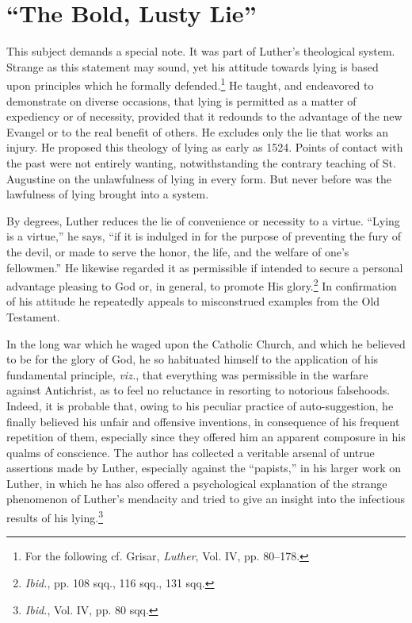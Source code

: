 \section{“The Bold, Lusty Lie”}

This subject demands a special note. It was part of Luther’s theological
system. Strange as this statement may sound, yet his attitude
towards lying is based upon principles which he formally defended.\footnote
{For the following cf. Grisar, \textit{Luther}, Vol. IV, pp. 80--178.}
He taught, and endeavored to demonstrate on diverse occasions, that
lying is permitted as a matter of expediency or of necessity, provided
that it redounds to the advantage of the new Evangel or to
the real benefit of others. He excludes only the lie that works an
injury. He proposed this theology of lying as early as 1524. Points
of contact with the past were not entirely wanting, notwithstanding
the contrary teaching of St. Augustine on the unlawfulness of lying
in every form. But never before was the lawfulness of lying brought
into a system.

By degrees, Luther reduces the lie of convenience or necessity to a
virtue. “Lying is a virtue,” he says, “if it is indulged in for the purpose
of preventing the fury of the devil, or made to serve the honor,
the life, and the welfare of one’s fellowmen.” He likewise regarded it
as permissible if intended to secure a personal advantage pleasing to
God or, in general, to promote His glory.\footnote{\textit{Ibid.}, pp. 108 sqq., 116 sqq., 131 sqq.}
 In confirmation of his
attitude he repeatedly appeals to misconstrued examples from the Old
Testament.

In the long war which he waged upon the Catholic Church, and
which he believed to be for the glory of God, he so habituated himself
to the application of his fundamental principle, \textit{viz.}, that everything
was permissible in the warfare against Antichrist, as to feel no reluctance
in resorting to notorious falsehoods. Indeed, it is probable that,
owing to his peculiar practice of auto-suggestion, he finally believed
his unfair and offensive inventions, in consequence of his frequent
repetition of them, especially since they offered him an apparent composure
in his qualms of conscience. The author has collected a veritable
arsenal of untrue assertions made by Luther, especially against the
“papists,” in his larger work on Luther, in which he has also offered a
psychological explanation of the strange phenomenon of Luther’s
mendacity and tried to give an insight into the infectious results of
his lying.\footnote{\textit{Ibid.}, Vol. IV, pp. 80 sqq.}
